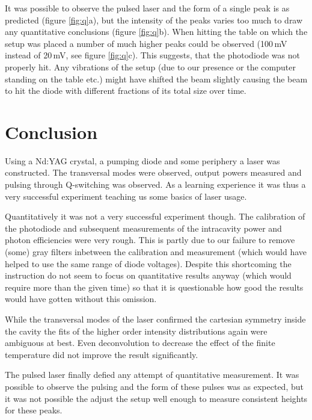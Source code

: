 \documentclass[a4paper]{scrartcl}
\numberwithin{equation}{section}
\numberwithin{figure}{section}
\numberwithin{table}{section}
\begin{document}
It was possible to observe the pulsed laser and the form of a single peak is as predicted (figure \ref{fig:q}a), but the intensity of the peaks varies too much to draw any quantitative conclusions (figure \ref{fig:q}b). When hitting the table on which the setup was placed a number of much higher peaks could be observed (100\,mV instead of 20\,mV, see figure \ref{fig:q}c). This suggests, that the photodiode was not properly hit. Any vibrations of the setup (due to our presence or the computer standing on the table etc.) might have shifted the beam slightly causing the beam to hit the diode with different fractions of its total size over time.



\section{Conclusion}
Using a Nd:YAG crystal, a pumping diode and some periphery a laser was constructed. The transversal modes were observed, output powers measured and pulsing through Q-switching was observed. As a learning experience it was thus a very successful experiment teaching us some basics of laser usage.

Quantitatively it was not a very successful experiment though. The calibration of the photodiode and subsequent measurements of the intracavity power and photon efficiencies were very rough. This is partly due to our failure to remove (some) gray filters inbetween the calibration and measurement (which would have helped to use the same range of diode voltages). Despite this shortcoming the instruction do not seem to focus on quantitative results anyway (which would require more than the given time) so that it is questionable how good the results would have gotten without this omission.

While the transversal modes of the laser confirmed the cartesian symmetry inside the cavity the fits of the higher order intensity distributions again were ambiguous at best. Even deconvolution to decrease the effect of the finite temperature did not improve the result significantly.

The pulsed laser finally defied any attempt of quantitative measurement. It was possible to observe the pulsing and the form of these pulses was as expected, but it was not possible the adjust the setup well enough to measure consistent heights for these peaks.


 

\end{document}
